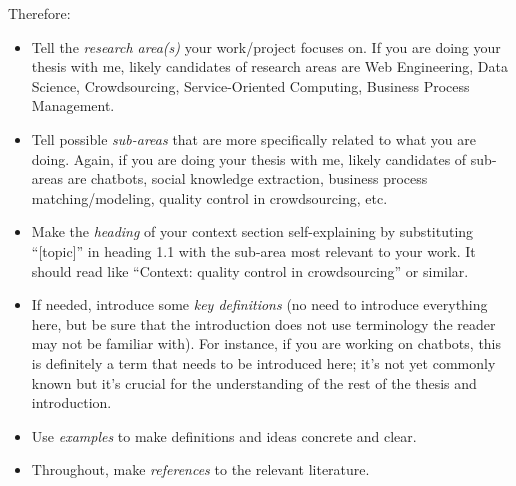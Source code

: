 Therefore:

\begin{itemize}
\item[\Square] Tell the \emph{research area(s)} your work/project focuses on. If you are doing your thesis with me, likely candidates of research areas are Web Engineering, Data Science, Crowdsourcing, Service-Oriented Computing, Business Process Management.
\item[\Square] Tell possible \emph{sub-areas} that are more specifically related to what you are doing. Again, if you are doing your thesis with me, likely candidates of sub-areas are chatbots, social knowledge extraction, business process matching/modeling, quality control in crowdsourcing, etc.
\item[\Square] Make the \emph{heading} of your context section self-explaining by substituting ``[topic]'' in heading 1.1 with the sub-area most relevant to your work. It should read like ``Context: quality control in crowdsourcing'' or similar.
\item[\Square] If needed, introduce some \emph{key definitions} (no need to introduce everything here, but be sure that the introduction does not use terminology the reader may not be familiar with). For instance, if you are working on chatbots, this is definitely a term that needs to be introduced here; it's not yet commonly known but it's crucial for the understanding of the rest of the thesis and introduction. 
\item[\Square] Use \emph{examples} to make definitions and ideas concrete and clear.
\item[\Square] Throughout, make \emph{references} to the relevant literature.
\end{itemize}


